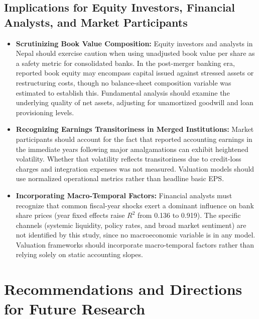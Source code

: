 \subsection{Implications for Equity Investors, Financial Analysts, and Market Participants}
\begin{itemize}
    \item \textbf{Scrutinizing Book Value Composition:}
    Equity investors and analysts in Nepal should exercise caution when using unadjusted book value per share as a safety metric for consolidated banks. In the post-merger banking era, reported book equity may encompass capital issued against stressed assets or restructuring costs, though no balance-sheet composition variable was estimated to establish this. Fundamental analysis should examine the underlying quality of net assets, adjusting for unamortized goodwill and loan provisioning levels.
    \item \textbf{Recognizing Earnings Transitoriness in Merged Institutions:}
    Market participants should account for the fact that reported accounting earnings in the immediate years following major amalgamations can exhibit heightened volatility. Whether that volatility reflects transitoriness due to credit-loss charges and integration expenses was not measured. Valuation models should use normalized operational metrics rather than headline basic EPS.
    \item \textbf{Incorporating Macro-Temporal Factors:}
    Financial analysts must recognize that common fiscal-year shocks exert a dominant influence on bank share prices (year fixed effects raise $R^2$ from 0.136 to 0.919). The specific channels (systemic liquidity, policy rates, and broad market sentiment) are not identified by this study, since no macroeconomic variable is in any model. Valuation frameworks should incorporate macro-temporal factors rather than relying solely on static accounting slopes.
\end{itemize}

\section{Recommendations and Directions for Future Research}

